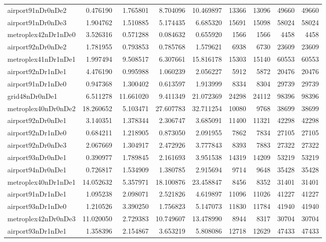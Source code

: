 \begin{longtable}{|l|r|r|r|r|r|r|r|r|}
airport91nDr0nDe2 & 0.476190 & 1.765801 & 8.704096 & 10.469897 & 13366 & 13096 & 49660 & 49660 \\
airport91nDr0nDe3 & 1.904762 & 1.510885 & 5.174435 & 6.685320 & 15691 & 15098 & 58024 & 58024 \\
metroplex42nDr1nDe0 & 3.526316 & 0.571288 & 0.084632 & 0.655920 & 1566 & 1566 & 4458 & 4458 \\
airport92nDr0nDe2 & 1.781955 & 0.793853 & 0.785768 & 1.579621 & 6938 & 6730 & 23609 & 23609 \\
metroplex41nDr1nDe1 & 1.997494 & 9.508517 & 6.307661 & 15.816178 & 15303 & 15140 & 60553 & 60553 \\
airport92nDr1nDe1 & 4.476190 & 0.995988 & 1.060239 & 2.056227 & 5912 & 5872 & 20476 & 20476 \\
airport91nDr1nDe0 & 0.947368 & 1.300402 & 0.613597 & 1.913999 & 8334 & 8304 & 29739 & 29739 \\
grid48nDr0nDe1 & 6.511278 & 11.661020 & 9.411349 & 21.072369 & 24298 & 24112 & 98396 & 98396 \\
metroplex40nDr0nDe2 & 18.260652 & 5.103471 & 27.607783 & 32.711254 & 10080 & 9768 & 38699 & 38699 \\
airport92nDr0nDe1 & 3.140351 & 1.378344 & 2.306747 & 3.685091 & 11400 & 11321 & 42298 & 42298 \\
airport92nDr1nDe0 & 0.684211 & 1.218905 & 0.873050 & 2.091955 & 7862 & 7834 & 27105 & 27105 \\
airport92nDr0nDe3 & 2.067669 & 1.304917 & 2.472926 & 3.777843 & 8393 & 7883 & 27322 & 27322 \\
airport93nDr0nDe1 & 0.390977 & 1.789845 & 2.161693 & 3.951538 & 14319 & 14209 & 53219 & 53219 \\
airport94nDr0nDe1 & 0.726817 & 1.534909 & 1.380785 & 2.915694 & 9714 & 9648 & 35428 & 35428 \\
metroplex40nDr1nDe1 & 14.052632 & 5.357971 & 18.100876 & 23.458847 & 8456 & 8352 & 31401 & 31401 \\
airport91nDr1nDe1 & 1.095238 & 2.098071 & 2.521826 & 4.619897 & 11096 & 11026 & 41227 & 41227 \\
airport93nDr1nDe0 & 1.210526 & 3.390250 & 1.756823 & 5.147073 & 11830 & 11784 & 41940 & 41940 \\
metroplex42nDr0nDe3 & 11.020050 & 2.729383 & 10.749607 & 13.478990 & 8944 & 8317 & 30704 & 30704 \\
airport93nDr1nDe1 & 1.358396 & 2.154867 & 3.653219 & 5.808086 & 12718 & 12629 & 47433 & 47433 \\

\end{longtable}

